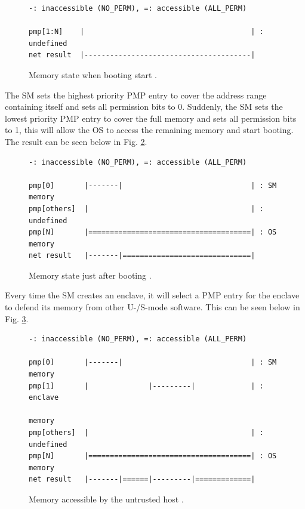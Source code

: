 \begin{figure}[H]
\begin{lstlisting}[frame=single,showspaces=true]
-: inaccessible (NO_PERM), =: accessible (ALL_PERM)

pmp[1:N]    |                                       | : undefined
net result  |---------------------------------------|   
\end{lstlisting}
\caption{Memory state when booting start \cite{keystone-doc}. \label{sm-pmp-1}}
\end{figure}
\noindent
The SM sets the highest priority PMP entry to cover the address range containing itself and sets all permission bits to 0. Suddenly, the SM sets the lowest priority PMP entry to cover the full memory and sets all permission bits to 1, this will allow the OS to access the remaining memory and start booting. The result can be seen below in Fig. \ref{sm-pmp-2}.
\begin{figure}[H]
\begin{lstlisting}[frame=single,showspaces=true]
-: inaccessible (NO_PERM), =: accessible (ALL_PERM)

pmp[0]       |-------|                              | : SM memory
pmp[others]  |                                      | : undefined
pmp[N]       |======================================| : OS memory
net result   |-------|==============================|
\end{lstlisting}
\caption{Memory state just after booting \cite{keystone-doc}. \label{sm-pmp-2}}
\end{figure}
\noindent
Every time the SM creates an enclave, it will select a PMP entry for the enclave to defend its memory from other U-/S-mode software. This can be seen below in Fig. \ref{sm-pmp-3}.
\begin{figure}[H]
\begin{lstlisting}[frame=single,showspaces=true]
-: inaccessible (NO_PERM), =: accessible (ALL_PERM)

pmp[0]       |-------|                              | : SM memory
pmp[1]       |              |---------|             | : enclave 
                                                        memory
pmp[others]  |                                      | : undefined
pmp[N]       |======================================| : OS memory
net result   |-------|======|---------|=============|
\end{lstlisting}
\caption{Memory accessible by the untrusted host \cite{keystone-doc}. \label{sm-pmp-3}}
\end{figure}
